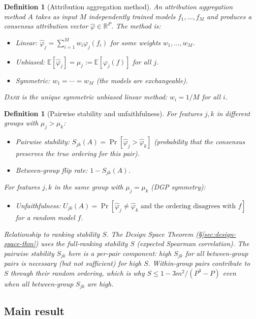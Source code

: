 \documentclass{article}
\newcommand{\DASH}{\textsc{Dash}}
\newtheorem{definition}[theorem]{Definition}
\begin{document}
\begin{definition}[Attribution aggregation method]
An \emph{attribution aggregation method} $A$ takes as input
$M$ independently trained models $f_1, \ldots, f_M$ and produces
a consensus attribution vector $\hat\varphi \in \mathbb{R}^P$.
The method is:
\begin{itemize}
    \item \emph{Linear}: $\hat\varphi_j = \sum_{i=1}^M w_i \varphi_j(f_i)$
      for some weights $w_1, \ldots, w_M$.
    \item \emph{Unbiased}: $\mathbb{E}[\hat\varphi_j] = \mu_j :=
      \mathbb{E}[\varphi_j(f)]$ for all $j$.
    \item \emph{Symmetric}: $w_1 = \cdots = w_M$ (the models are
      exchangeable).
\end{itemize}
\DASH{} is the unique symmetric unbiased linear method:
$w_i = 1/M$ for all $i$.
\end{definition}

\begin{definition}[Pairwise stability and unfaithfulness]
For features $j, k$ in different groups with $\mu_j > \mu_k$:
\begin{itemize}
    \item \emph{Pairwise stability}: $S_{jk}(A) = \Pr[\hat\varphi_j > \hat\varphi_k]$
      (probability that the consensus preserves the true ordering
      for this pair).
    \item \emph{Between-group flip rate}: $1 - S_{jk}(A)$.
\end{itemize}
For features $j, k$ in the same group with $\mu_j = \mu_k$ (DGP symmetry):
\begin{itemize}
    \item \emph{Unfaithfulness}: $U_{jk}(A) = \Pr[\hat\varphi_j \neq \hat\varphi_k \text{ and the ordering disagrees with } f]$ for a random model $f$.
\end{itemize}

\emph{Relationship to ranking stability $S$.} The Design Space Theorem
(\S\ref{sec:design-space-thm}) uses the full-ranking stability $S$ (expected
Spearman correlation). The pairwise stability $S_{jk}$ here is a
per-pair component: high $S_{jk}$ for all between-group pairs is
necessary (but not sufficient) for high $S$. Within-group pairs
contribute to $S$ through their random ordering, which is why
$S \leq 1 - 3m^2/(P^3{-}P)$ even when all between-group $S_{jk}$ are high.
\end{definition}

\subsection{Main result}
\end{document}

